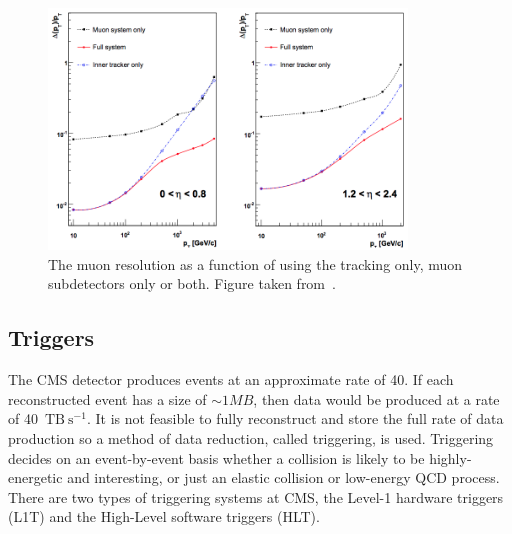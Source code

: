 \begin{figure}[htpb]
	\centering
	\includegraphics[width=0.85\textwidth]{Figures/CMSMUONRES}
	\caption[The muon \pt{} resolution as a function of \pt{} using the tracking only, muon subdetectors only or both.]{The muon \pt{} resolution as a function of \pt{} using the tracking only, muon subdetectors only or both. Figure taken from~\cite{CMSExperiment}.}
	\label{fig:CMSMuonRes}
\end{figure}

\subsection{Triggers}
\label{ssec:Trig}

The CMS detector produces events at an approximate rate of 40\MHz{}. 
If each reconstructed event has a size of $\sim1\unit{MB}$, then data would be produced at a rate of 40~$\mathrm{TB}~\mathrm{s}^{-1}$. 
It is not feasible to fully reconstruct and store the full rate of data production so a method of data reduction, called triggering, is used. 
Triggering decides on an event-by-event basis whether a collision is likely to be highly-energetic and interesting, or just an elastic collision or low-energy QCD process. 
There are two types of triggering systems at CMS, the Level-1 hardware triggers (L1T) and the High-Level software triggers (HLT). 

